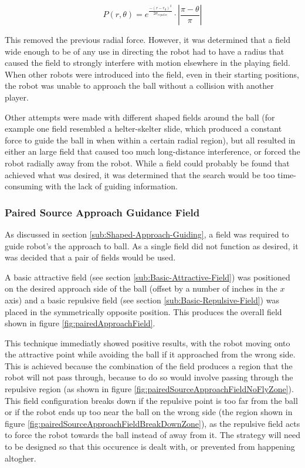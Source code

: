\documentclass[10pt,british,english]{article}
\begin{document}
\begin{equation}
P\left(r,\theta\right)=e^{\frac{-\left(r-r_{0}\right)^{2}}{2\sigma_{repulse}}}\cdot\left|\frac{\pi-\theta}{\pi}\right|\label{eq:insetWrappedGaussian}
\end{equation}

This removed the previous radial force. However, it was determined that a field wide enough to be of any use in directing the robot had to have a radius that caused the field to strongly interfere with motion elsewhere in the playing field. When other robots were introduced into the field, even in their starting positions, the robot was unable to approach the ball without a collision with another player.

Other attempts were made with different shaped fields around the ball (for example one field resembled a helter-skelter slide, which produced a constant force to guide the ball in when within a certain radial region), but all resulted in either an large field that caused too much long-distance interference, or forced the robot radially away from the robot. While a field could probably be found that achieved what was desired, it was determined that the search would be too time-consuming with the lack of guiding information.

\subsubsection{Paired Source Approach Guidance Field}

As discussed in section \ref{sub:Shaped-Approach-Guiding}, a field was required to guide robot's the approach to ball. As a single field did not function as desired, it was decided that a pair of fields would be used.

A basic attractive field (see section \ref{sub:Basic-Attractive-Field}) was positioned on the desired approach side of the ball (offset by a number of inches in the $x$ axis) and a basic repulsive field (see section \ref{sub:Basic-Repulsive-Field}) was placed in the symmetrically opposite position. This produces the overall field shown in figure \ref{fig:pairedApproachField}.

This technique immediatly showed positive results, with the robot moving onto the attractive point while avoiding the ball if it approached from the wrong side. This is achieved because the combination of the field produces a region that the robot will not pass through, because to do so would involve passing through the repulsive region (as shown in figure \ref{fig:pairedSourceApproachFieldNoFlyZone}).  This field configuration breaks down if the repulsive point is too far from the ball or if the robot ends up too near the ball on the wrong side (the region shown in figure \ref{fig:pairedSourceApproachFieldBreakDownZone}), as the repulsive field acts to force the robot towards the ball instead of away from it.  The strategy will need to be designed so that this occurence is dealt with, or prevented from happening altogher.
\end{document}
